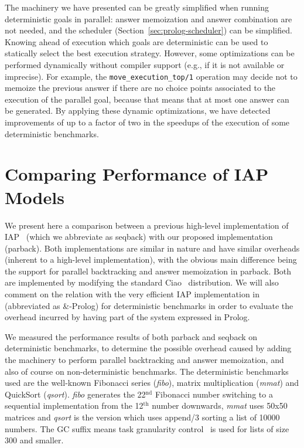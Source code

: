 \documentclass{tlp}
\newcounter{mnotei} \setcounter{mnotei}{0}
\newcommand{\mnote}[1]{{\scriptsize\textsf{\textcolor{blue}{$^{[\themnotei]}$}}}\marginpar{\scriptsize\textsf{\textcolor{red}{n.\themnotei: #1}}}\stepcounter{mnotei} }
\renewcommand{\mnote}[1]{}
\newcommand{\compressection}{\vspace{-1em}}
\begin{document}
The machinery we have presented can be greatly simplified when running
deterministic goals in parallel: answer memoization and answer
combination are not needed, and the scheduler
(Section~\ref{sec:prolog-scheduler}) can be simplified.
Knowing ahead of execution which goals are deterministic can be used
to statically select the best execution strategy.
However, some optimizations can be performed dynamically without
compiler support (e.g., if it is not available or imprecise).
For example, the \lstinline{move_execution_top/1} operation may decide
not to memoize the previous answer if there are no choice points
associated to the execution of the parallel goal, because that means
that at most one answer can be generated.\mnote{MCL: any other?}
By applying these dynamic optimizations, we have detected improvements
of up to a factor of two in the speedups of the execution of some
deterministic benchmarks.



\compressection
\section{Comparing Performance of IAP Models}
\label{sec:benchmarks}

We present here a comparison between a previous high-level
implementation of IAP~\cite{hlfullandpar-iclp2008} (which we
abbreviate as \textsf{seqback}) with our proposed implementation
(\textsf{parback}).  Both implementations are similar in nature and
have similar overheads (inherent to a high-level implementation), with
the obvious main difference being the support for parallel
backtracking and answer memoization in \textsf{parback}.
Both are implemented by modifying the standard
Ciao~\cite{ciao-reference-manual-1.13-short,hermenegildo11:ciao-design-tplp}
distribution. 
We will also comment on the relation with the very efficient IAP
implementation in~\cite{ngc-and-prolog} (abbreviated as
\textsf{\&-Prolog}) for deterministic benchmarks in order to evaluate
the overhead incurred by having part of the system expressed in
Prolog. 

We measured the performance results of both \textsf{parback} and
\textsf{seqback} on deterministic benchmarks, to determine the possible
overhead caused by adding the machinery to perform parallel
backtracking and answer memoization, and also of course on
non-deterministic benchmarks. 
The deterministic benchmarks used are the well-known Fibonacci series
(\emph{fibo}), matrix multiplication (\emph{mmat}) and QuickSort
(\emph{qsort}).
\emph{fibo} generates the 22$^{\mathrm{nd}}$ Fibonacci number
switching to a sequential implementation from the 12$^{\mathrm{th}}$
number downwards, \emph{mmat} uses 50x50 matrices and \emph{qsort} is
the version which uses \textsf{append/3} sorting a list of 10000
numbers.  The GC suffix means task granularity
control~\cite{granularity-jsc} is used for lists of size 300 and
smaller.
 
\end{document}
